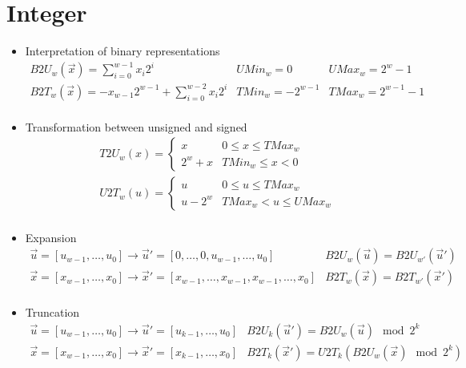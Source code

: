 \ifx\PREAMBLE\undefined


\fi
\newpage
\section{Integer}
\begin{itemize}
\item Interpretation of binary representations
\begin{equation*}
\begin{array}{lll}
B2U_w(\overrightarrow{x})=\sum\limits_{i=0}^{w-1}x_i2^i & UMin_w=0 & UMax_w=2^w-1\\

B2T_w(\overrightarrow{x})=-x_{w-1}2^{w-1}+\sum\limits_{i=0}^{w-2}x_i2^i & TMin_w=-2^{w-1} & TMax_w=2^{w-1}
-1\\
\end{array}
\end{equation*}

\item Transformation between unsigned and signed
\begin{gather*}
T2U_w(x)=\begin{cases}
x & 0 \le x \le TMax_w\\
2^w+x & TMin_w\le x < 0
\end{cases}\\
U2T_w(u)=\begin{cases}
u & 0 \le u \le TMax_w\\
u - 2^w & TMax_w < u \le UMax_w
\end{cases}\\
\end{gather*}

\item Expansion
\begin{equation*}
\begin{array}{ll}
\overrightarrow{u}=[u_{w-1},\dots,u_0]\rightarrow\overrightarrow{u}'=[0,\dots,0,u_{w-1},\dots,u_0] & B2U_w(\overrightarrow{u})=B2U_{w'}(\overrightarrow{u}')\\
\overrightarrow{x}=[x_{w-1},\dots,x_0]\rightarrow\overrightarrow{x}'=[x_{w-1},\dots,x_{w-1},x_{w-1},\dots,x_0] & B2T_w(\overrightarrow{x})=B2T_{w'}(\overrightarrow{x}')\\
\end{array}
\end{equation*}

\item Truncation
\begin{equation*}
\begin{array}{ll}
\overrightarrow{u}=[u_{w-1},\dots,u_0]\rightarrow\overrightarrow{u}'=[u_{k-1},\dots,u_0] & 
B2U_k(\overrightarrow{u}')=B2U_{w}(\overrightarrow{u})\mod 2^k\\
\overrightarrow{x}=[x_{w-1},\dots,x_0]\rightarrow\overrightarrow{x}'=[x_{k-1},\dots,x_0] & 
B2T_k(\overrightarrow{x}')=U2T_{k}\left(B2U_{w}(\overrightarrow{x})\mod 2^k\right)\\
\end{array}
\end{equation*}


\end{itemize}
